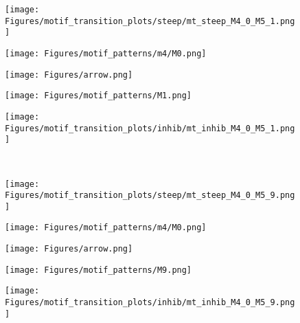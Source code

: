 \documentclass[smallextended]{svjour3}       %
\theoremstyle{definition}
\begin{document}
 \begin{figure}[]
 	\centering
 	\hfill
 	\begin{minipage}{0.32\textwidth}%
 		\texttt{[image: Figures/motif\_transition\_plots/steep/mt\_steep\_M4\_0\_M5\_1.png]}
 	\end{minipage}
 	\hfill
 	\begin{minipage}{0\textwidth}%
 		\texttt{[image: Figures/motif\_patterns/m4/M0.png]}	
 	\end{minipage}
 	\hfill
 	\begin{minipage}{0\textwidth}%
 		\texttt{[image: Figures/arrow.png]}	
 	\end{minipage}
 	\hfill
 	\begin{minipage}{0.05\textwidth}%
 		\texttt{[image: Figures/motif\_patterns/M1.png]}	
 	\end{minipage}
 	\hfill
 	\begin{minipage}{0.25\textwidth}
 		\texttt{[image: Figures/motif\_transition\_plots/inhib/mt\_inhib\_M4\_0\_M5\_1.png]}
 	\end{minipage}
 	\hfill
 	\\
 	\hfill
 	\begin{minipage}{0.32\textwidth}%
 		\texttt{[image: Figures/motif\_transition\_plots/steep/mt\_steep\_M4\_0\_M5\_9.png]}
 	\end{minipage}
 	\hfill
 	\begin{minipage}{0\textwidth}%
 		\texttt{[image: Figures/motif\_patterns/m4/M0.png]}	
 	\end{minipage}
 	\hfill
 	\begin{minipage}{0\textwidth}%
 		\texttt{[image: Figures/arrow.png]}	
 	\end{minipage}
 	\hfill
 	\begin{minipage}{0.05\textwidth}%
 		\texttt{[image: Figures/motif\_patterns/M9.png]}	
 	\end{minipage}
 	\hfill
 	\begin{minipage}{0.25\textwidth}
 		\texttt{[image: Figures/motif\_transition\_plots/inhib/mt\_inhib\_M4\_0\_M5\_9.png]}
 	\end{minipage}

\end{figure}
\end{document}
